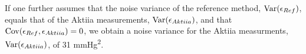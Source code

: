 If one further assumes that the noise variance of the reference method,
$\operatorname{Var}(\epsilon_{Ref})$, equals that of the Aktiia measurements, $\operatorname{Var}(\epsilon_{Aktiia})$,
and that $\operatorname{Cov}(\epsilon_{Ref}, \epsilon_{Aktiia})=0$, we obtain a noise variance
for the Aktiia measurments,
$\operatorname{Var}(\epsilon_{Aktiia})$, of 31 mmHg\textsuperscript{2}.




